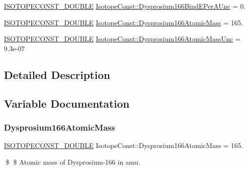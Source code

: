\begin{DoxyCompactItemize}
\item 
\mbox{\hyperlink{group___isotope_const-_macros_ga8f45a7272ce02c0b4c65c44636ed719a}{I\+S\+O\+T\+O\+P\+E\+C\+O\+N\+S\+T\+\_\+\+D\+O\+U\+B\+LE}} \mbox{\hyperlink{group___isotope_const-_dysprosium-_dy166_gac83dd3492dd5cd1e52c6bc79efdb2b0d}{Isotope\+Const\+::\+Dysprosium166\+Bind\+E\+Per\+A\+Unc}} = 0.
\item 
\mbox{\hyperlink{group___isotope_const-_macros_ga8f45a7272ce02c0b4c65c44636ed719a}{I\+S\+O\+T\+O\+P\+E\+C\+O\+N\+S\+T\+\_\+\+D\+O\+U\+B\+LE}} \mbox{\hyperlink{group___isotope_const-_dysprosium-_dy166_ga0f35debd1e3f138b7a189b4384634e19}{Isotope\+Const\+::\+Dysprosium166\+Atomic\+Mass}} = 165.
\item 
\mbox{\hyperlink{group___isotope_const-_macros_ga8f45a7272ce02c0b4c65c44636ed719a}{I\+S\+O\+T\+O\+P\+E\+C\+O\+N\+S\+T\+\_\+\+D\+O\+U\+B\+LE}} \mbox{\hyperlink{group___isotope_const-_dysprosium-_dy166_ga1134de1489a5e4e6a20ee2494423753e}{Isotope\+Const\+::\+Dysprosium166\+Atomic\+Mass\+Unc}} = 9.\+3e-\/07
\end{DoxyCompactItemize}


\subsection{Detailed Description}


\subsection{Variable Documentation}
\mbox{\label{group___isotope_const-_dysprosium-_dy166_ga0f35debd1e3f138b7a189b4384634e19}} 
\subsubsection{\texorpdfstring{Dysprosium166\+Atomic\+Mass}{Dysprosium166AtomicMass}}
{\footnotesize\ttfamily \mbox{\hyperlink{group___isotope_const-_macros_ga8f45a7272ce02c0b4c65c44636ed719a}{I\+S\+O\+T\+O\+P\+E\+C\+O\+N\+S\+T\+\_\+\+D\+O\+U\+B\+LE}} Isotope\+Const\+::\+Dysprosium166\+Atomic\+Mass = 165.}

\$ \$ Atomic mass of Dysprosium-\/166 in amu. \mbox{\label{group___isotope_const-_dysprosium-_dy166_ga1134de1489a5e4e6a20ee2494423753e}} 
